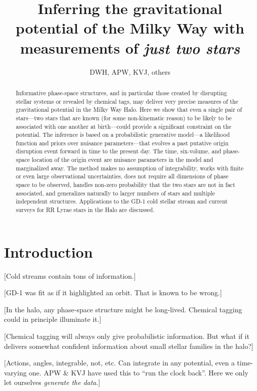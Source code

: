 \documentclass[letterpaper,12pt,preprint]{aastex}
\begin{document}
\title{Inferring the gravitational potential of the Milky Way with measurements of \emph{just two stars}}
\author{DWH, APW, KVJ, others}

\begin{abstract}
Informative phase-space structures, and in particular those created by
disrupting stellar systems or revealed by chemical tags, may deliver
very precise measures of the gravitational potential in the Milky Way
Halo.  Here we show that even a single pair of stars---two stars that
are known (for some non-kinematic reason) to be likely to be
associated with one another at birth---could provide a significant
constraint on the potential.  The inference is based on a
probabilistic generative model---a likelihood function and priors over
nuisance parameters---that evolves a past putative origin disruption
event forward in time to the present day.  The time, six-volume, and
phase-space location of the origin event are nuisance parameters in
the model and marginalized away.  The method makes no assumption of
integrability, works with finite or even large observational
uncertainties, does not require all dimensions of phase space to be
observed, handles non-zero probability that the two stars are not in
fact associated, and generalizes naturally to larger numbers of stars
and multiple independent structures.  Applications to the GD-1 cold
stellar stream and current surveys for RR Lyrae stars in the Halo are
discussed.
\end{abstract}


\section{Introduction}

[Cold streams contain tons of information.]

[GD-1 was fit as if it highlighted an orbit.  That is known to be
  wrong.]

[In the halo, any phase-space structure might be long-lived.  Chemical
  tagging could in principle illuminate it.]

[Chemical tagging will always only give probabilistic information.
  But what if it delivers somewhat confident information about small
  stellar families in the halo?]

[Actions, angles, integrable, not, etc.  Can integrate in any
  potential, even a time-varying one.  APW \& KVJ have used this to
  ``run the clock back''.  Here we only let ourselves \emph{generate
    the data}.]
\end{document}
